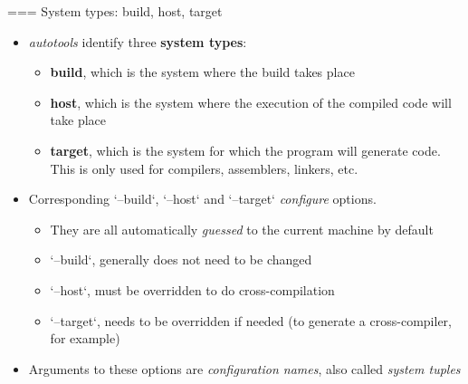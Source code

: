 === {System types: build, host, target}
  \begin{itemize}
  \item {\em autotools} identify three {\bf system types}:
    \begin{itemize}
    \item {\bf build}, which is the system where the build takes place
    \item {\bf host}, which is the system where the execution of the
      compiled code will take place
    \item {\bf target}, which is the system for which the program will
      generate code. This is only used for compilers, assemblers,
      linkers, etc.
    \end{itemize}
  \item Corresponding `--build`, `--host` and
    `--target` {\em configure} options.
    \begin{itemize}
    \item They are all automatically {\em guessed} to the current
      machine by default
    \item `--build`, generally does not need to be changed
    \item `--host`, must be overridden to do cross-compilation
    \item `--target`, needs to be overridden if needed (to
      generate a cross-compiler, for example)
    \end{itemize}
  \item Arguments to these options are {\em configuration names}, also
    called {\em system tuples}
  \end{itemize}


